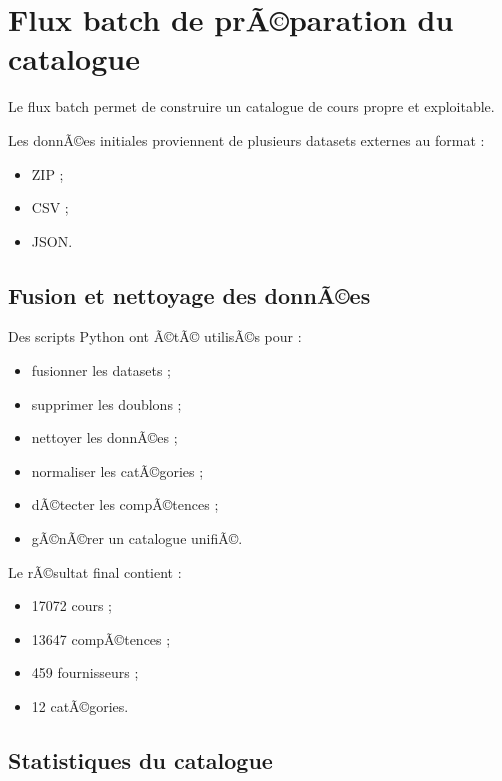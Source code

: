 ﻿\documentclass[12pt,a4paper]{report}
\begin{document}
\section{Flux batch de prÃ©paration du catalogue}

Le flux batch permet de construire un catalogue de cours propre et exploitable.

Les donnÃ©es initiales proviennent de plusieurs datasets externes au format :
\begin{itemize}
    \item ZIP ;
    \item CSV ;
    \item JSON.
\end{itemize}

\subsection{Fusion et nettoyage des donnÃ©es}

Des scripts Python ont Ã©tÃ© utilisÃ©s pour :
\begin{itemize}
    \item fusionner les datasets ;
    \item supprimer les doublons ;
    \item nettoyer les donnÃ©es ;
    \item normaliser les catÃ©gories ;
    \item dÃ©tecter les compÃ©tences ;
    \item gÃ©nÃ©rer un catalogue unifiÃ©.
\end{itemize}

Le rÃ©sultat final contient :
\begin{itemize}
    \item 17072 cours ;
    \item 13647 compÃ©tences ;
    \item 459 fournisseurs ;
    \item 12 catÃ©gories.
\end{itemize}

\subsection{Statistiques du catalogue}
\end{document}
